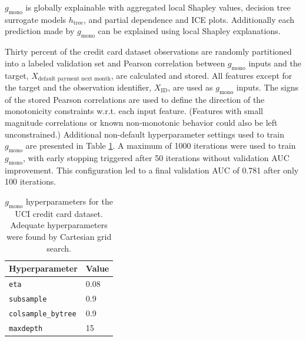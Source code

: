 \documentclass[sigconf, review]{acmart}
\begin{document}
\noindent$g_{\text{mono}}$ is globally explainable with aggregated local Shapley values, decision tree surrogate models $h_{\text{tree}}$, and partial dependence and ICE plots. Additionally each prediction made by $g_{\text{mono}}$ can be explained using local Shapley explanations. 

Thirty percent of the credit card dataset observations are randomly partitioned into a labeled validation set and Pearson correlation between $g_{\text{mono}}$ inputs and the target, $X_{\text{default payment next month}}$, are calculated and stored. All features except for the target and the observation identifier, $X_{\text{ID}}$, are used as $g_{\text{mono}}$ inputs. The signs of the stored Pearson correlations are used to define the direction of the monotonicity constraints w.r.t. each input feature. (Features with small magnitude correlations or known non-monotonic behavior could also be left unconstrained.) Additional non-default hyperparameter settings used to train $g_{\text{mono}}$ are presented in Table \ref{tab:mono_gbm}. A maximum of 1000 iterations were used to train $g_{\text{mono}}$, with early stopping triggered after 50 iterations without validation AUC improvement. This configuration led to a final validation AUC of 0.781 after only 100 iterations. 

\begin{table}[ht]
	\centering
	\caption{$g_{\text{mono}}$ hyperparameters for the UCI credit card dataset. Adequate hyperparameters were found by Cartesian grid search.}
	\begin{tabular}{ | p{3.5cm} | p{1.2cm} | }
	\hline
	Hyperparameter & Value \\ 
	\hline
	\texttt{eta} & 0.08 \\
	\hline	
	\texttt{subsample} & 0.9 \\
	\hline	
	\texttt{colsample\_bytree} & 0.9 \\
	\hline
	\texttt{maxdepth} & 15 \\	
	\hline
	\end{tabular}
	\label{tab:mono_gbm}
\end{table}	 
\end{document}
